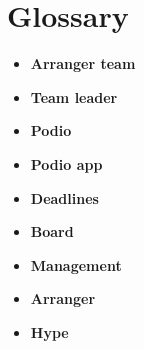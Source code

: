 \section{Glossary}
\begin{itemize}
	\item \textbf{Arranger team}\\
	\item \textbf{Team leader}\\
	\item \textbf{Podio}\\
	\item \textbf{Podio app}
	\item \textbf{Deadlines}\\
	\item \textbf{Board}\\
	\item \textbf{Management}\\
	\item \textbf{Arranger}\\
	\item \textbf{Hype}\\
\end{itemize}